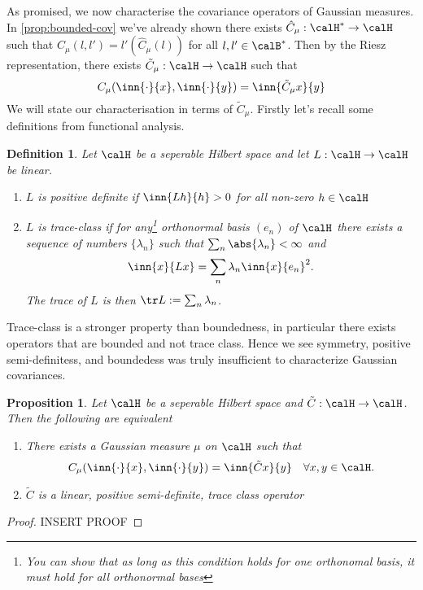 \documentclass[fontsize=12pt, DIV=10]{scrreprt}
\theoremstyle{mydefn}
\newtheorem{defn}{Definition}
\newtheorem{prop}{Proposition}
\theoremstyle{remark}
\newcommand{\defeq}{:=}
\begin{document}
As promised, we now characterise the covariance operators  of Gaussian measures. In \vref{prop:bounded-cov} we've already shown there exists $\hat{C}_{\mu}: \calH^* \to \calH$ such that $C_{\mu}(l, l') = l'(\hat{C}_{\mu}(l))$ for all $l, l' \in \calB^*$. Then by the Riesz representation, there exists $\tilde{C}_{\mu}: \calH \to \calH$ such that
\begin{equation}
	C_{\mu}(\inn{\cdot}{x}, \inn{\cdot}{y}) = \inn{\tilde{C}_{\mu}x}{y}
\end{equation}
We will state our characterisation in terms of $\tilde{C}_{\mu}$. Firstly let's recall some definitions from functional analysis.
\begin{defn}
	Let $\calH$ be a seperable Hilbert space and let $L: \calH \to \calH$ be linear.
	\begin{enumerate}
		\item $L$ is \emph{positive definite} if $\inn{L h}{h} > 0$ for all non-zero $h \in \calH$
		\item $L$ is \emph{trace-class} if for any\footnote{You can show that as long as this condition holds for one orthonomal basis, it must hold for all orthonormal bases} orthonormal basis $(e_n)$ of $\calH$ there exists a sequence of numbers $\{\lambda_n\}$ such that $\sum_n \abs{\lambda_n} < \infty$ and
			\begin{equation}
				\inn{x}{Lx} = \sum_n \lambda_n \inn{x}{e_n}^2.
			\end{equation}
			The \emph{trace} of $L$ is then $\tr L \defeq \sum_n \lambda _n$.
	\end{enumerate}
\end{defn}

Trace-class is a stronger property than boundedness, in particular there exists operators that are bounded and not trace class. Hence we see symmetry, positive semi-definitess, and boundedess was truly insufficient to characterize Gaussian covariances.
\begin{prop}
	Let $\calH$ be a seperable Hilbert space and $\tilde{C}: \calH \to \calH$. Then the following are equivalent
	\begin{enumerate}
		\item There exists a Gaussian measure $\mu$ on $\calH$ such that
			\begin{equation}
				C_{\mu}(\inn{\cdot}{x}, \inn{\cdot}{y}) = \inn{\tilde{C} x}{y} \quad \forall x, y \in \calH.
			\end{equation}
		\item $\tilde{C}$ is a linear, positive semi-definite, trace class operator
	\end{enumerate}
\end{prop}
\begin{proof}
	INSERT PROOF
\end{proof}
\end{document}
